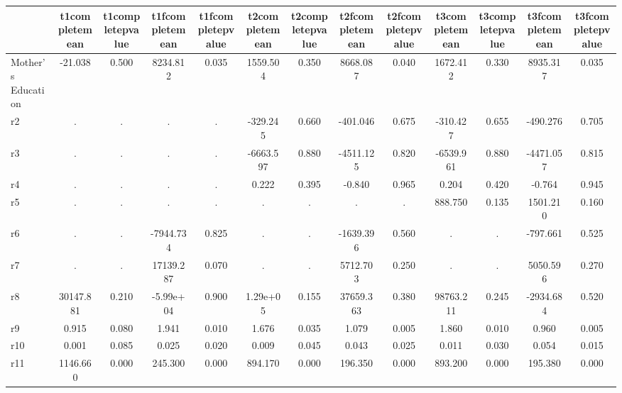 \begin{tabular}{lcccccccccccc} \hline \hline
 & t1completemean  & t1completepvalue  & t1fcompletemean  & t1fcompletepvalue  & t2completemean  & t2completepvalue  & t2fcompletemean  & t2fcompletepvalue  & t3completemean  & t3completepvalue  & t3fcompletemean  & t3fcompletepvalue  \\  \hline 
Mother's Education &   -21.038 &     0.500 &  8234.812 &     0.035 &  1559.504 &     0.350 &  8668.087 &     0.040 &  1672.412 &     0.330 &  8935.317 &     0.035 \\  
r2 &         . &         . &         . &         . &  -329.245 &     0.660 &  -401.046 &     0.675 &  -310.427 &     0.655 &  -490.276 &     0.705 \\  
r3 &         . &         . &         . &         . & -6663.597 &     0.880 & -4511.125 &     0.820 & -6539.961 &     0.880 & -4471.057 &     0.815 \\  
r4 &         . &         . &         . &         . &     0.222 &     0.395 &    -0.840 &     0.965 &     0.204 &     0.420 &    -0.764 &     0.945 \\  
r5 &         . &         . &         . &         . &         . &         . &         . &         . &   888.750 &     0.135 &  1501.210 &     0.160 \\  
r6 &         . &         . & -7944.734 &     0.825 &         . &         . & -1639.396 &     0.560 &         . &         . &  -797.661 &     0.525 \\  
r7 &         . &         . & 17139.287 &     0.070 &         . &         . &  5712.703 &     0.250 &         . &         . &  5050.596 &     0.270 \\  
r8 & 30147.881 &     0.210 & -5.99e+04 &     0.900 &  1.29e+05 &     0.155 & 37659.363 &     0.380 & 98763.211 &     0.245 & -2934.684 &     0.520 \\  
r9 &     0.915 &     0.080 &     1.941 &     0.010 &     1.676 &     0.035 &     1.079 &     0.005 &     1.860 &     0.010 &     0.960 &     0.005 \\  
r10 &     0.001 &     0.085 &     0.025 &     0.020 &     0.009 &     0.045 &     0.043 &     0.025 &     0.011 &     0.030 &     0.054 &     0.015 \\  
r11 &  1146.660 &     0.000 &   245.300 &     0.000 &   894.170 &     0.000 &   196.350 &     0.000 &   893.200 &     0.000 &   195.380 &     0.000 \\  
\hline \hline \end{tabular}
